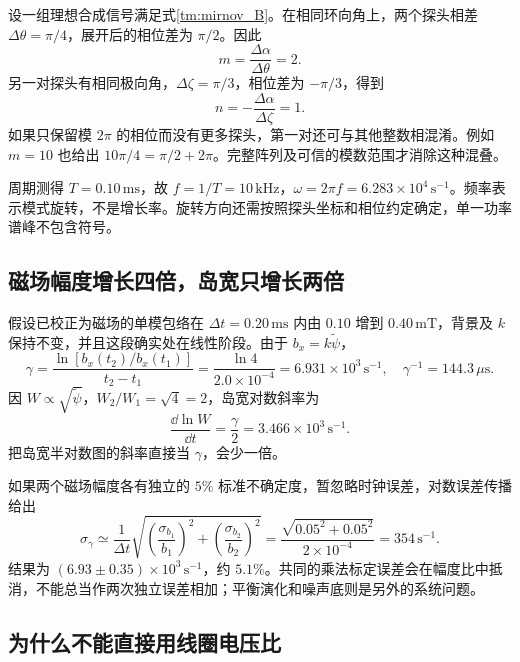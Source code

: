 设一组理想合成信号满足式\eqref{tm:mirnov_B}。在相同环向角上，两个探头相差 $\Delta\theta=\pi/4$，展开后的相位差为 $\pi/2$。因此
\begin{equation}
 m=\frac{\Delta\alpha}{\Delta\theta}=2.
\end{equation}
另一对探头有相同极向角，$\Delta\zeta=\pi/3$，相位差为 $-\pi/3$，得到
\begin{equation}
 n=-\frac{\Delta\alpha}{\Delta\zeta}=1.
\end{equation}
如果只保留模 $2\pi$ 的相位而没有更多探头，第一对还可与其他整数相混淆。例如 $m=10$ 也给出 $10\pi/4=\pi/2+2\pi$。完整阵列及可信的模数范围才消除这种混叠。

周期测得 $T=0.10\,\mathrm{ms}$，故 $f=1/T=10\,\mathrm{kHz}$，$\omega=2\pi f=6.283\times10^4\,\mathrm{s^{-1}}$。频率表示模式旋转，不是增长率。旋转方向还需按照探头坐标和相位约定确定，单一功率谱峰不包含符号。

\subsection{磁场幅度增长四倍，岛宽只增长两倍}

假设已校正为磁场的单模包络在 $\Delta t=0.20\,\mathrm{ms}$ 内由 $0.10$ 增到 $0.40\,\mathrm{mT}$，背景及 $k$ 保持不变，并且这段确实处在线性阶段。由于 $b_x=k\widetilde\psi$，
\begin{equation}
 \gamma=\frac{\ln[b_x(t_2)/b_x(t_1)]}{t_2-t_1}
 =\frac{\ln4}{2.0\times10^{-4}}
 =6.931\times10^3\,\mathrm{s^{-1}},
 \quad \gamma^{-1}=144.3\,\mu\mathrm s.
\end{equation}
因 $W\propto\sqrt{\widetilde\psi}$，$W_2/W_1=\sqrt4=2$，岛宽对数斜率为
\begin{equation}
 \frac{\dd\ln W}{\dd t}=\frac\gamma2
 =3.466\times10^3\,\mathrm{s^{-1}}.
\end{equation}
把岛宽半对数图的斜率直接当 $\gamma$，会少一倍。

如果两个磁场幅度各有独立的 $5\%$ 标准不确定度，暂忽略时钟误差，对数误差传播给出
\begin{equation}
 \sigma_\gamma\simeq\frac{1}{\Delta t}
 \sqrt{\left(\frac{\sigma_{b_1}}{b_1}\right)^2+
       \left(\frac{\sigma_{b_2}}{b_2}\right)^2}
 =\frac{\sqrt{0.05^2+0.05^2}}{2\times10^{-4}}
 =354\,\mathrm{s^{-1}}.
\end{equation}
结果为 $(6.93\pm0.35)\times10^3\,\mathrm{s^{-1}}$，约 $5.1\%$。共同的乘法标定误差会在幅度比中抵消，不能总当作两次独立误差相加；平衡演化和噪声底则是另外的系统问题。

\subsection{为什么不能直接用线圈电压比}

